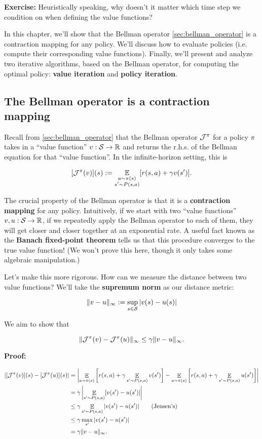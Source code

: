 \documentclass[../main/main]{subfiles}
\begin{document}
\textbf{Exercise:} Heuristically speaking, why doesn't it matter which time step we condition on when defining the value functions?

In this chapter, we'll show that the Bellman operator \ref{sec:bellman_operator} is a contraction mapping for any policy. We'll discuss how to evaluate policies (i.e. compute their corresponding value functions). Finally, we'll present and analyze two iterative algorithms, based on the Bellman operator, for computing the optimal policy: \textbf{value iteration} and \textbf{policy iteration}.


\subsection{The Bellman operator is a contraction mapping}

Recall from \ref{sec:bellman_operator} that the Bellman operator $\bop^{\pi}$ for a policy $\pi$ takes in a ``value function'' $v : \S \to \R$ and returns the r.h.s. of the Bellman equation for that ``value function''. In the infinite-horizon setting, this is

\[
    [\bop^{\pi}(v)](s) := \E_{\substack{a \sim \pi(s) \\ s' \sim P(s, a)}} [r(s, a) + \gamma v(s')].
\]

The crucial property of the Bellman operator is that it is a \textbf{contraction mapping} for any policy. Intuitively, if we start with two ``value functions'' $v, u : \S \to \R$, if we repeatedly apply the Bellman operator to each of them, they will get closer and closer together at an exponential rate. A useful fact known as the \textbf{Banach fixed-point theorem} tells us that this procedure converges to the true value function! (We won't prove this here, though it only takes some algebraic manipulation.)

Let's make this more rigorous. How can we measure the distance between two value functions? We'll take the \textbf{supremum norm} as our distance metric:

\[
    \| v - u \|_{\infty} := \sup_{s \in \S} |v(s) - u(s)|
\]

We aim to show that

\[\|\bop^{\pi} (v) - \bop^{\pi} (u) \|_{\infty} \le \gamma \|v - u \|_{\infty}.\]

\textbf{Proof:}

\begin{align*}
|[\bop^{\pi} (v)](s) - [\bop^{\pi} (u)](s)|&= \left| \mathop{\mathbb{E}}_{a \sim \pi(s)} \left[ r(s, a) + \gamma \mathop{\mathbb{E}}_{s' \sim P(s, a)} v(s') \right] - \mathop{\mathbb{E}}_{a \sim \pi(s)} \left[r(s, a) + \gamma \mathop{\mathbb{E}}_{s' \sim P(s, a)} u(s') \right] \right| \\
&= \gamma \left|\mathop{\mathbb{E}}_{s' \sim P(s, a)} [v(s') - u(s')] \right| \\
&\le \gamma \mathop{\mathbb{E}}_{s' \sim P(s, a)}|v(s') - u(s')| \qquad \text{(Jensen's)} \\
&\le \gamma \max_{s'} |v(s') - u(s')| \\
&= \gamma \|v - u \|_{\infty}.
\end{align*}
\end{document}
